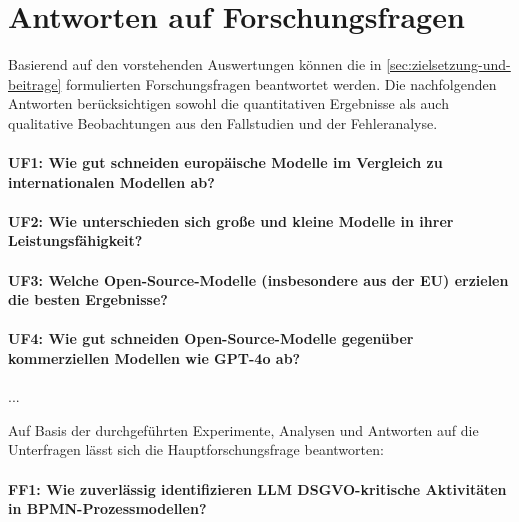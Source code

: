 \section{Antworten auf Forschungsfragen}\label{sec:antworten-auf-forschungsfragen}

Basierend auf den vorstehenden Auswertungen können die in \ref{sec:zielsetzung-und-beitrage} formulierten Forschungsfragen beantwortet werden. Die nachfolgenden Antworten berücksichtigen sowohl die quantitativen Ergebnisse als auch qualitative Beobachtungen aus den Fallstudien und der Fehleranalyse.

\paragraph{UF1: Wie gut schneiden europäische Modelle im Vergleich zu internationalen Modellen ab?}

\paragraph{UF2: Wie unterschieden sich große und kleine Modelle in ihrer Leistungsfähigkeit?}

\paragraph{UF3: Welche Open-Source-Modelle (insbesondere aus der EU) erzielen die besten Ergebnisse?}

\paragraph{UF4: Wie gut schneiden Open-Source-Modelle gegenüber kommerziellen Modellen wie GPT-4o ab?}

...

Auf Basis der durchgeführten Experimente, Analysen und Antworten auf die Unterfragen lässt sich die Hauptforschungsfrage beantworten:

\paragraph{FF1: Wie zuverlässig identifizieren LLM DSGVO-kritische Aktivitäten in BPMN-Prozessmodellen?}